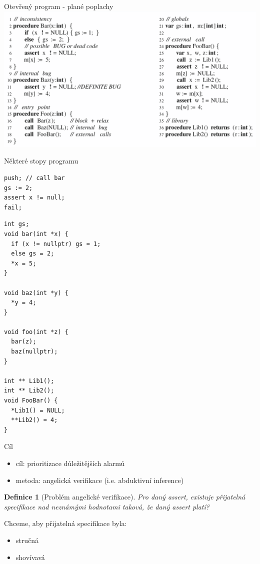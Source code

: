 \documentclass[11pt]{beamer}
\newtheorem{dfn}{Definice}
\begin{document}
\begin{frame}{Otevřený program - plané poplachy}
\includegraphics[width=1.0\linewidth]{img/exampleProgram.png}
\end{frame}

\begin{frame}[fragile]{Některé stopy programu}
\begin{lstlisting}
push; // call bar
gs := 2;
assert x != null;
fail;
\end{lstlisting}
\end{frame}

\begin{frame}[fragile]
\begin{lstlisting}
int gs;
void bar(int *x) {
  if (x != nullptr) gs = 1;
  else gs = 2;
  *x = 5;
}

void baz(int *y) {
  *y = 4;
}

void foo(int *z) {
  bar(z);
  baz(nullptr);
}

int ** Lib1();
int ** Lib2();
void FooBar() {
  *Lib1() = NULL;
  **Lib2() = 4;
}
\end{lstlisting}
\end{frame}


\begin{frame}{Cíl}
\begin{itemize}
\item cíl: prioritizace důležitějších alarmů
\item  metoda: angelická verifikace (i.e. abduktivní inference)
\end{itemize}

\begin{dfn}[Problém angelické verifikace]
Pro daný assert, existuje přijatelná specifikace nad neznámými hodnotami taková,
že daný assert platí?
\end{dfn}

Chceme, aby přijatelná specifikace byla:
\begin{itemize}
\item stručná
\item shovívavá
\end{itemize}

\end{frame}
\end{document}
